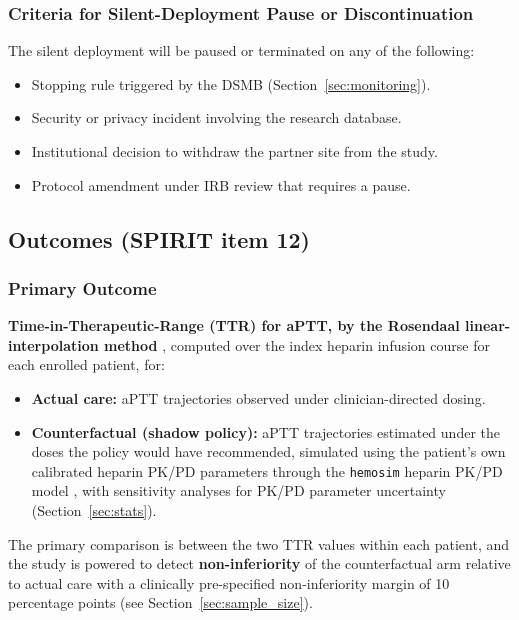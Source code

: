 \documentclass[11pt]{article}
\begin{document}
\subsubsection{Criteria for Silent-Deployment Pause or Discontinuation}

The silent deployment will be paused or terminated on any of the following:
\begin{itemize}
  \item Stopping rule triggered by the DSMB (Section~\ref{sec:monitoring}).
  \item Security or privacy incident involving the research database.
  \item Institutional decision to withdraw the partner site from the study.
  \item Protocol amendment under IRB review that requires a pause.
\end{itemize}

\subsection{Outcomes (SPIRIT item 12)}

\subsubsection{Primary Outcome}

\textbf{Time-in-Therapeutic-Range (TTR) for aPTT, by the Rosendaal linear-interpolation method} \citep{rosendaal1993}, computed over the index heparin infusion course for each enrolled patient, for:
\begin{itemize}
  \item \textbf{Actual care:} aPTT trajectories observed under clinician-directed dosing.
  \item \textbf{Counterfactual (shadow policy):} aPTT trajectories estimated under the doses the policy would have recommended, simulated using the patient's own calibrated heparin PK/PD parameters through the \texttt{hemosim} heparin PK/PD model \citep{hemosim2026}, with sensitivity analyses for PK/PD parameter uncertainty (Section~\ref{sec:stats}).
\end{itemize}

The primary comparison is between the two TTR values within each patient, and the study is powered to detect \textbf{non-inferiority} of the counterfactual arm relative to actual care with a clinically pre-specified non-inferiority margin of 10 percentage points (see Section~\ref{sec:sample_size}).
\end{document}
